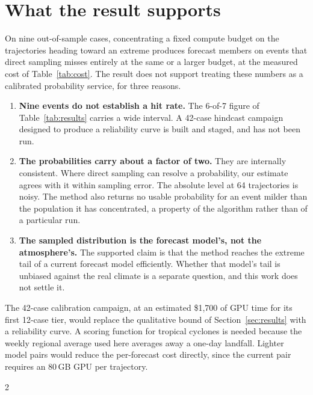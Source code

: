 \documentclass[11pt]{article}
\begin{document}
\section{What the result supports}
\label{sec:scope}

On nine out-of-sample cases, concentrating a fixed compute budget on the trajectories heading
toward an extreme produces forecast members on events that direct sampling misses entirely at the
same or a larger budget, at the measured cost of Table~\ref{tab:cost}. The result does not support
treating these numbers as a calibrated probability service, for three reasons.

\begin{enumerate}
\item \textbf{Nine events do not establish a hit rate.} The 6-of-7 figure of
  Table~\ref{tab:results} carries a wide interval. A 42-case hindcast campaign designed to
  produce a reliability curve is built and staged, and has not been run.
\item \textbf{The probabilities carry about a factor of two.} They are internally consistent. Where
  direct sampling can resolve a probability, our estimate agrees with it within sampling error.
  The absolute level at 64 trajectories is noisy. The method also returns no
  usable probability for an event milder than the population it has concentrated, a property of
  the algorithm rather than of a particular run.
\item \textbf{The sampled distribution is the forecast model's, not the atmosphere's.} The
  supported claim is that the method reaches the extreme tail of a current forecast model
  efficiently. Whether that model's tail is unbiased against the real climate is a separate
  question, and this work does not settle it.
\end{enumerate}

The 42-case calibration campaign, at an estimated \$1,700 of GPU time
for its first 12-case tier, would replace the qualitative bound of Section~\ref{sec:results} with
a reliability curve. A scoring function for tropical cyclones is needed because the weekly
regional average used here averages away a one-day landfall. Lighter model pairs would reduce the
per-forecast cost directly, since the current pair requires an 80\,GB GPU per trajectory.

{\footnotesize

\begin{multicols}{2}

\end{multicols}
}
\end{document}
